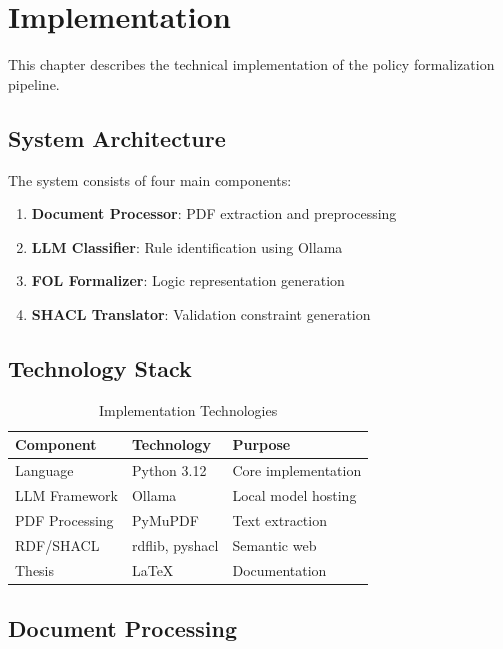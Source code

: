 \chapter{Implementation}
\label{ch:implementation}

This chapter describes the technical implementation of the policy formalization pipeline.

\section{System Architecture}

The system consists of four main components:

\begin{enumerate}
    \item \textbf{Document Processor}: PDF extraction and preprocessing
    \item \textbf{LLM Classifier}: Rule identification using Ollama
    \item \textbf{FOL Formalizer}: Logic representation generation
    \item \textbf{SHACL Translator}: Validation constraint generation
\end{enumerate}

\section{Technology Stack}

\begin{table}[h]
\centering
\caption{Implementation Technologies}
\begin{tabular}{|l|l|l|}
\hline
\textbf{Component} & \textbf{Technology} & \textbf{Purpose} \\
\hline
Language & Python 3.12 & Core implementation \\
LLM Framework & Ollama & Local model hosting \\
PDF Processing & PyMuPDF & Text extraction \\
RDF/SHACL & rdflib, pyshacl & Semantic web \\
Thesis & LaTeX & Documentation \\
\hline
\end{tabular}
\end{table}

\section{Document Processing}

